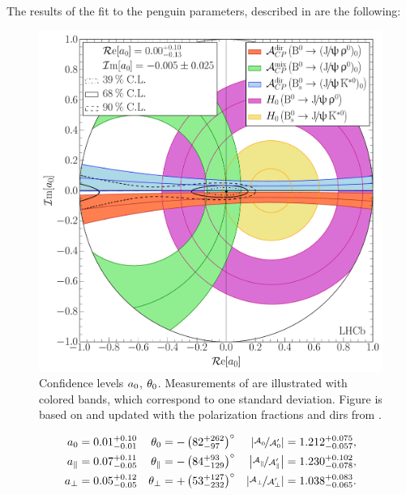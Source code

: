 The results of the \chisq fit to the penguin parameters, described in 
are the following:

\begin{figure}[t!]
  \centering
  \includegraphics[trim=0.0cm 0.0cm 0.0cm 0.0cm, clip=true,scale=0.39]{Figures/Chapter5/Penguin_Contribution_Re_vs_Im_allB2VV_Long_withH.pdf}
  \caption{Confidence levels $a_{0}$, $\theta_{0}$. Measurements of  are illustrated with
           colored bands, which correspond to one standard deviation. Figure is based on \cite{DeBruyn-thesis}
           and updated with the \BsJpsiKst polarization fractions and \Acp{dir} from .}
  \label{pengPlot_long}
\end{figure}

\begin{subequations}
\label{peng_a_theta_results}
\begin{align}
    a_{0}         & = 0.01^{+0.10}_{-0.01} & \theta_{0}         & = -\left( 82^{+262}_{-97} \right)^\circ &  \left| \nicefrac{\mathcal{A}_{0}^{} }{\mathcal{A}_{0}^{\prime}} \right|          = 1.212^{+0.075}_{-0.057},\\
    a_{\parallel} & = 0.07^{+0.11}_{-0.05} & \theta_{\parallel} & = -\left( 84^{+93}_{-129} \right)^\circ  &  \left| \nicefrac{\mathcal{A}_{\parallel}^{} }{\mathcal{A}_{\parallel}^{\prime}} \right|  = 1.230^{+0.102}_{-0.078},\\
    a_{\perp}     & = 0.05^{+0.12}_{-0.05} & \theta_{\perp}     & = +\left( 53^{+127}_{-232} \right)^\circ &  \left| \nicefrac{\mathcal{A}_{\perp}^{} }{\mathcal{A}_{\perp}^{\prime}} \right|      = 1.038^{+0.083}_{-0.065}.
\end{align}
\end{subequations}

